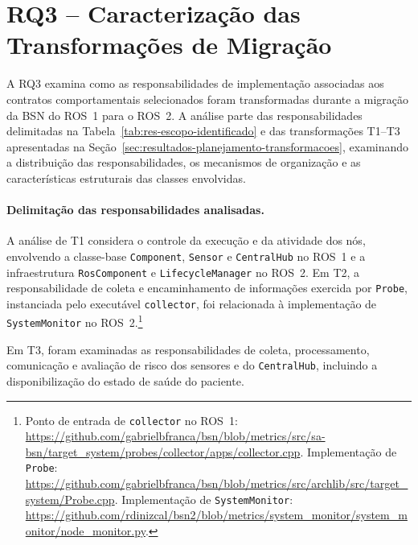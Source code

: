 \section{RQ3 -- Caracterização das Transformações de Migração}
\label{sec:avaliacao-rq3}

A RQ3 examina como as responsabilidades de implementação associadas aos contratos comportamentais selecionados foram transformadas durante a migração da BSN do ROS~1 para o ROS~2. A análise parte das responsabilidades delimitadas na Tabela~\ref{tab:res-escopo-identificado} e das transformações T1--T3 apresentadas na Seção~\ref{sec:resultados-planejamento-transformacoes}, examinando a distribuição das responsabilidades, os mecanismos de organização e as características estruturais das classes envolvidas.

\paragraph{Delimitação das responsabilidades analisadas.}

A análise de T1 considera o controle da execução e da atividade dos nós, envolvendo a classe-base \texttt{Component}, \texttt{Sensor} e \texttt{CentralHub} no ROS~1 e a infraestrutura \texttt{RosComponent} e \texttt{LifecycleManager} no ROS~2. Em T2, a responsabilidade de coleta e encaminhamento de informações exercida por \texttt{Probe}, instanciada pelo executável \texttt{collector}, foi relacionada à implementação de \texttt{SystemMonitor} no ROS~2.\footnote{Ponto de entrada de \texttt{collector} no ROS~1: \url{https://github.com/gabrielbfranca/bsn/blob/metrics/src/sa-bsn/target_system/probes/collector/apps/collector.cpp}. Implementação de \texttt{Probe}: \url{https://github.com/gabrielbfranca/bsn/blob/metrics/src/archlib/src/target_system/Probe.cpp}. Implementação de \texttt{SystemMonitor}: \url{https://github.com/rdinizcal/bsn2/blob/metrics/system_monitor/system_monitor/node_monitor.py}.}

Em T3, foram examinadas as responsabilidades de coleta, processamento, comunicação e avaliação de risco dos sensores e do \texttt{CentralHub}, incluindo a disponibilização do estado de saúde do paciente.

